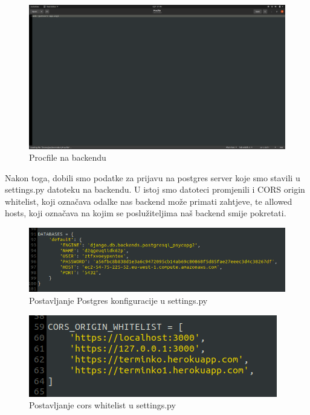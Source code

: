 			\begin{figure}[H]
				\centering
				\includegraphics[scale=0.25]{slike/ProcFileBackend.PNG}
				\caption{Procfile na backendu}
				\label{fig:promjene}
			\end{figure}
		
			Nakon toga, dobili smo podatke za prijavu na postgres server koje smo stavili u settings.py datoteku na backendu. U istoj smo datoteci promjenili i CORS origin whitelist, koji označava odalke nas backend može primati zahtjeve, te allowed hosts, koji označava na kojim se poslužiteljima naš backend smije pokretati.
			
			\begin{figure}[H]
				\centering
				\includegraphics[scale=0.50]{slike/DatabaseData.PNG}
				\caption{Postavljanje Postgres konfiguracije u settings.py}
				\label{fig:promjene}
			\end{figure}
		
			\begin{figure}[H]
				\centering
				\includegraphics[scale=0.80]{slike/CorsWhitelist.PNG}
				\caption{Postavljanje cors whitelist u settings.py}
				\label{fig:promjene}
			\end{figure}
		
